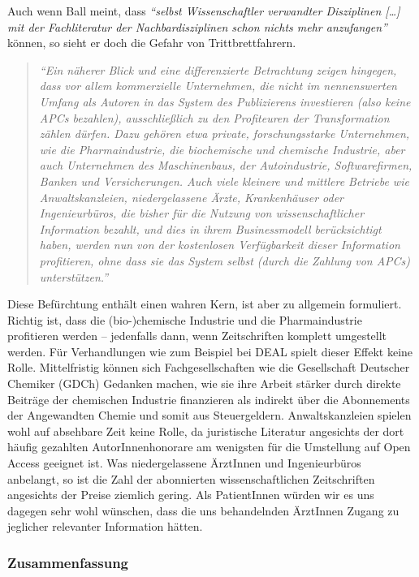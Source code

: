 \documentclass[a4paper,
fontsize=11pt,
oneside,
numbers=noperiodatend,
parskip=half-,
bibliography=totoc,
final
]{scrartcl}
\begin{document}
Auch wenn Ball meint, dass \emph{\enquote{selbst Wissenschaftler
verwandter Disziplinen {[}\ldots{}{]} mit der Fachliteratur der
Nachbardisziplinen schon nichts mehr anzufangen}} können, so sieht er
doch die Gefahr von Trittbrettfahrern.

\begin{quote}
\emph{\enquote{Ein näherer Blick und eine differenzierte Betrachtung
zeigen hingegen, dass vor allem kommerzielle Unternehmen, die nicht im
nennenswerten Umfang als Autoren in das System des Publizierens
investieren (also keine APCs bezahlen), ausschließlich zu den
Profiteuren der Transformation zählen dürfen. Dazu gehören etwa private,
forschungsstarke Unternehmen, wie die Pharmaindustrie, die biochemische
und chemische Industrie, aber auch Unternehmen des Maschinenbaus, der
Autoindustrie, Softwarefirmen, Banken und Versicherungen. Auch viele
kleinere und mittlere Betriebe wie Anwaltskanzleien, niedergelassene
Ärzte, Krankenhäuser oder Ingenieurbüros, die bisher für die Nutzung von
wissenschaftlicher Information bezahlt, und dies in ihrem Businessmodell
berücksichtigt haben, werden nun von der kostenlosen Verfügbarkeit
dieser Information profitieren, ohne dass sie das System selbst (durch
die Zahlung von APCs) unterstützen.}}
\end{quote}

Diese Befürchtung enthält einen wahren Kern, ist aber zu allgemein
formuliert. Richtig ist, dass die (bio-)chemische Industrie und die
Pharmaindustrie profitieren werden -- jedenfalls dann, wenn
Zeitschriften komplett umgestellt werden. Für Verhandlungen wie zum
Beispiel bei DEAL spielt dieser Effekt keine Rolle. Mittelfristig können
sich Fachgesellschaften wie die Gesellschaft Deutscher Chemiker (GDCh)
Gedanken machen, wie sie ihre Arbeit stärker durch direkte Beiträge der
chemischen Industrie finanzieren als indirekt über die Abonnements der
Angewandten Chemie und somit aus Steuergeldern. Anwaltskanzleien spielen
wohl auf absehbare Zeit keine Rolle, da juristische Literatur angesichts
der dort häufig gezahlten AutorInnenhonorare am wenigsten für die
Umstellung auf Open Access geeignet ist. Was niedergelassene ÄrztInnen
und Ingenieurbüros anbelangt, so ist die Zahl der abonnierten
wissenschaftlichen Zeitschriften angesichts der Preise ziemlich gering.
Als PatientInnen würden wir es uns dagegen sehr wohl wünschen, dass die
uns behandelnden ÄrztInnen Zugang zu jeglicher relevanter Information
hätten.

\subsubsection{Zusammenfassung}\label{zusammenfassung}
\end{document}

